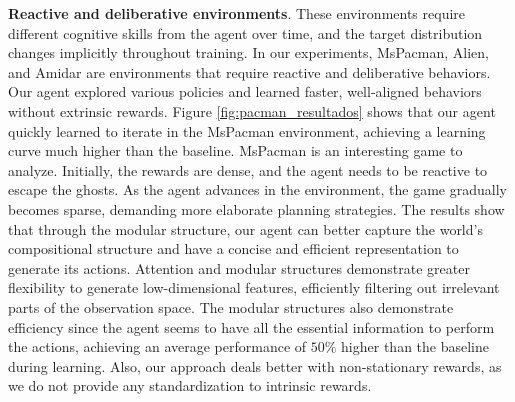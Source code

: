 
\textbf{Reactive and deliberative environments}. These environments require different cognitive skills from the agent over time, and the target distribution changes implicitly throughout training. In our experiments, MsPacman, Alien, and Amidar are environments that require reactive and deliberative behaviors. Our agent explored various policies and learned faster, well-aligned behaviors without extrinsic rewards. Figure \ref{fig:pacman_resultados} shows that our agent quickly learned to iterate in the MsPacman environment, achieving a learning curve much higher than the baseline. MsPacman is an interesting game to analyze. Initially, the rewards are dense, and the agent needs to be reactive to escape the ghosts. As the agent advances in the environment, the game gradually becomes sparse, demanding more elaborate planning strategies. The results show that through the modular structure, our agent can better capture the world's compositional structure and have a concise and efficient representation to generate its actions. Attention and modular structures demonstrate greater flexibility to generate low-dimensional features, efficiently filtering out irrelevant parts of the observation space. The modular structures also demonstrate efficiency since the agent seems to have all the essential information to perform the actions, achieving an average performance of $50\%$ higher than the baseline during learning. Also, our approach deals better with non-stationary rewards, as we do not provide any standardization to intrinsic rewards.



